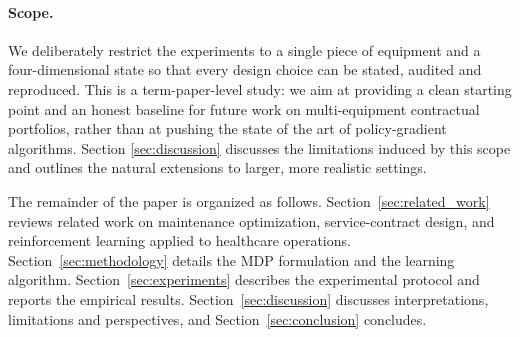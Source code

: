 \paragraph{Scope.} We deliberately restrict the experiments to a single
piece of equipment and a four-dimensional state so that every design
choice can be stated, audited and reproduced. This is a term-paper-level
study: we aim at providing a clean starting point and an honest baseline
for future work on multi-equipment contractual portfolios, rather than
at pushing the state of the art of policy-gradient algorithms. Section
\ref{sec:discussion} discusses the limitations induced by this scope and
outlines the natural extensions to larger, more realistic settings.

The remainder of the paper is organized as follows.
Section~\ref{sec:related_work} reviews related work on maintenance
optimization, service-contract design, and reinforcement learning applied to
healthcare operations. Section~\ref{sec:methodology} details the MDP
formulation and the learning algorithm. Section~\ref{sec:experiments}
describes the experimental protocol and reports the empirical results.
Section~\ref{sec:discussion} discusses interpretations, limitations and
perspectives, and Section~\ref{sec:conclusion} concludes.
